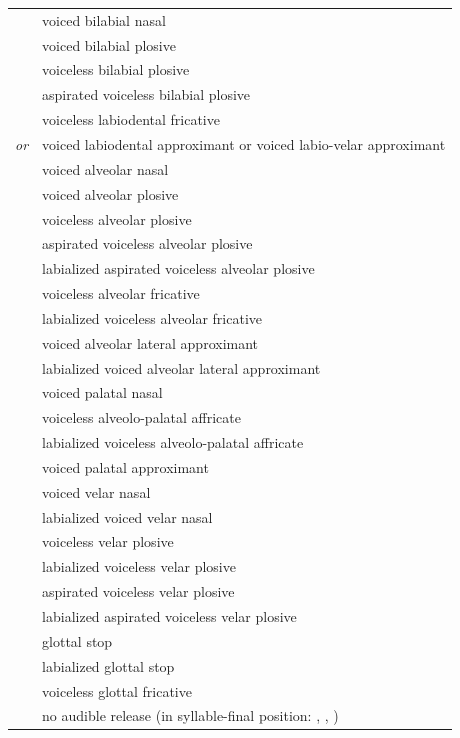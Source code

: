 \documentclass{article}
\begin{document}
\begin{xltabular}{\textwidth}{lL}
   & voiced bilabial nasal \\
   & voiced bilabial plosive \\
   & voiceless bilabial plosive \\
   & aspirated voiceless bilabial plosive \\
   & voiceless labiodental fricative \\
   \textit{or}  & voiced labiodental approximant or voiced labio-velar approximant \\
   & voiced alveolar nasal \\
   & voiced alveolar plosive \\
   & voiceless alveolar plosive \\
   & aspirated voiceless alveolar plosive \\
   & labialized aspirated voiceless alveolar plosive \\
   & voiceless alveolar fricative \\
   & labialized voiceless alveolar fricative \\
   & voiced alveolar lateral approximant \\
   & labialized voiced alveolar lateral approximant \\
   & voiced palatal nasal \\
   & voiceless alveolo-palatal affricate \\
   & labialized voiceless alveolo-palatal affricate \\
   & voiced palatal approximant \\
   & voiced velar nasal \\
   & labialized voiced velar nasal \\
   & voiceless velar plosive \\
   & labialized voiceless velar plosive \\
   & aspirated voiceless velar plosive \\
   & labialized aspirated voiceless velar plosive \\
   & glottal stop \\
   & labialized glottal stop \\
   & voiceless glottal fricative \\
  \ipa{\textcorner} & no audible release (in syllable-final position: , , ) \\
\end{xltabular}
\end{document}
